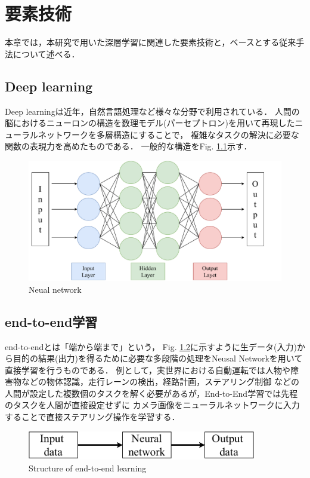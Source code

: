 \chapter{要素技術}
本章では，本研究で用いた深層学習に関連した要素技術と，ベースとする従来手法について述べる．

\section{Deep learning}
Deep learningは近年，自然言語処理など様々な分野で利用されている．
人間の脳におけるニューロンの構造を数理モデル(パーセプトロン)を用いて再現したニューラルネットワークを多層構造にすることで，
複雑なタスクの解決に必要な関数の表現力を高めたものである．
一般的な構造をFig. \ref{fig::network}示す．

\begin{figure}[h]
    \centering
    \includegraphics[width = 12cm]{./figs/net.pdf}
    \caption{Neual network}
    \label{fig::network}
\end{figure}

\section{end-to-end学習}
end-to-endとは「端から端まで」という，
Fig. \ref{fig::e2e}に示すように生データ(入力)から目的の結果(出力)を得るために必要な多段階の処理をNeusal Networkを用いて直接学習を行うものである．
例として，実世界における自動運転では人物や障害物などの物体認識，走行レーンの検出，経路計画，ステアリング制御
などの人間が設定した複数個のタスクを解く必要があるが，End-to-End学習では先程のタスクを人間が直接設定せずに
カメラ画像をニューラルネットワークに入力することで直接ステアリング操作を学習する．

\vspace{2.0zh}
\begin{figure}[h]
    \centering
    \includegraphics[width = 10cm]{./figs/e2e.pdf}
    \caption{Structure of end-to-end learning}
    \label{fig::e2e}
\end{figure}

